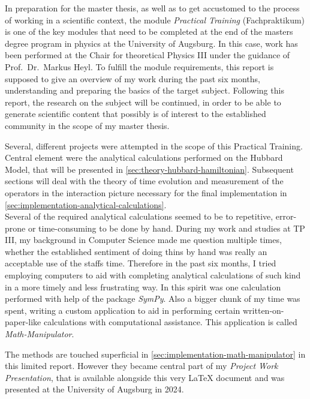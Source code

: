In preparation for the master thesis, as well as to get accustomed to the process of working in a scientific context, the module \emph{Practical Training} (\glqq Fachpraktikum\grqq{}) is one of the key modules that need to be completed at the end of the masters degree program in physics at the University of Augsburg.
In this case, work has been performed at the Chair for theoretical Physics III under the guidance of  Prof.~Dr.~Markus Heyl.
To fulfill the module requirements, this report is supposed to give an overview of my work during the past six months, understanding and preparing the basics of the target subject.
Following this report, the research on the subject will be continued, in order to be able to generate scientific content that possibly is of interest to the established community in the scope of my master thesis.

Several, different projects were attempted in the scope of this Practical Training. 
Central element were the analytical calculations performed on the Hubbard Model, that will be presented in \autoref{sec:theory-hubbard-hamiltonian}.
Subsequent sections will deal with the theory of time evolution and measurement of the operators in the interaction picture necessary for the final implementation in \autoref{sec:implementation-analytical-calculations}.\\

Several of the required analytical calculations seemed to be to repetitive, error-prone or time-consuming to be done by hand. 
During my work and studies at TP III, my background in Computer Science made me question multiple times, whether the established sentiment of doing thins \glqq by hand\grqq{} was really an acceptable use of the staffs time.
Therefore in the past six months, I tried employing computers to aid with completing analytical calculations of such kind in a more timely and less frustrating way.
In this spirit was one calculation performed with help of the package \emph{SymPy}.
Also a bigger chunk of my time was spent, writing a custom application to aid in performing certain \glqq written-on-paper-like\grqq{} calculations with computational assistance. This application is called \emph{Math-Manipulator}.

The methods are touched superficial in \autoref{sec:implementation-math-manipulator} in this limited report. 
However they became central part of my \emph{Project Work Presentation}, that is available alongside this very LaTeX document \cite{selfDocument} and was presented at the University of Augsburg in 2024.
